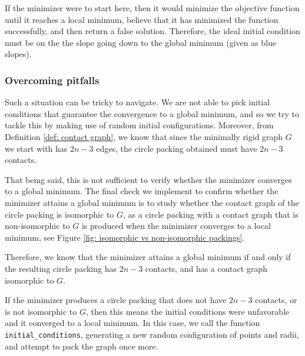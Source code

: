 \begin{flushleft}
If the minimizer were to start here, then it would minimize the objective function until it reaches a local minimum, believe that it has minimized the function successfully, and then return a false solution. Therefore, the ideal initial condition must be on the the slope going down to the global minimum (given as blue slopes).
\end{flushleft}

\subsubsection{Overcoming pitfalls}

\begin{flushleft}
Such a situation can be tricky to navigate. We are not able to pick initial conditions that guarantee the convergence to a global minimum, and so we try to tackle this by making use of random initial configurations. Moreover, from Definition \ref{def: contact graph}, we know that since the minimally rigid graph $G$ we start with has $2n-3$ edges, the circle packing obtained must have $2n-3$ contacts.
\end{flushleft}

\begin{flushleft}
That being said, this is not sufficient to verify whether the minimizer converges to a global minimum. The final check we implement to confirm whether the minimizer attains a global minimum is to study whether the contact graph of the circle packing is isomorphic to $G$, as a circle packing with a contact graph that is non-isomorphic to $G$ is produced when the minimizer converges to a local minimum, see Figure \ref{fig: isomorphic vs non-isomorphic packings}. 
\end{flushleft}

\begin{flushleft}
Therefore, we know that the minimizer attains a global minimum if and only if the resulting circle packing has $2n-3$ contacts, and has a contact graph isomorphic to $G$. 
\end{flushleft}

\begin{flushleft}
If the minimizer produces a circle packing that does not have $2n-3$ contacts, or is not isomorphic to $G$, then this means the initial conditions were unfavorable and it converged to a local minimum. In this case, we call the function \texttt{initial\_conditions}, generating a new random configuration of points and radii, and attempt to pack the graph once more. 
\end{flushleft}

